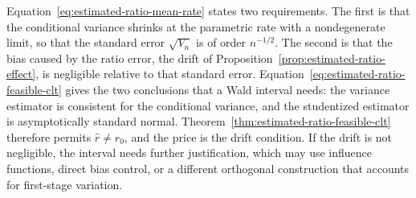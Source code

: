 Equation~\eqref{eq:estimated-ratio-mean-rate} states two requirements. The first is that the conditional variance shrinks at the parametric rate with a nondegenerate limit, so that the standard error $\sqrt{V_n}$ is of order $n^{-1/2}$. The second is that the bias caused by the ratio error, the drift of Proposition~\ref{prop:estimated-ratio-effect}, is negligible relative to that standard error. Equation~\eqref{eq:estimated-ratio-feasible-clt} gives the two conclusions that a Wald interval needs: the variance estimator is consistent for the conditional variance, and the studentized estimator is asymptotically standard normal. Theorem~\ref{thm:estimated-ratio-feasible-clt} therefore permits $\widehat r\neq r_0$, and the price is the drift condition. If the drift is not negligible, the interval needs further justification, which may use influence functions, direct bias control, or a different orthogonal construction that accounts for first-stage variation.

